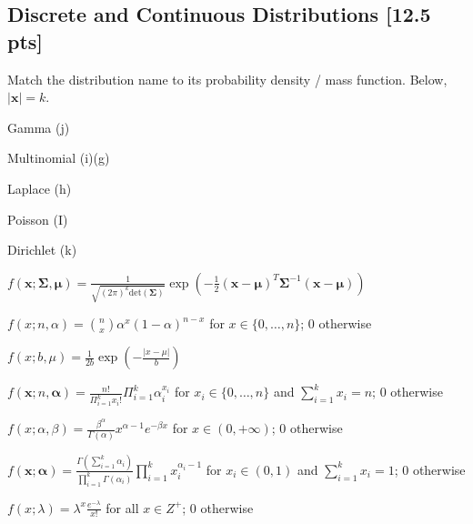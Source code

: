 \documentclass[a4paper]{article}
\theoremstyle{definition}
\newcommand{\vc}[1]{\boldsymbol{#1}}
\newcommand{\xv}{\vc{x}}
\newcommand{\Sigmav}{\vc{\Sigma}}
\newcommand{\alphav}{\vc{\alpha}}
\newcommand{\muv}{\vc{\mu}}
\newenvironment{soln}{
	\leavevmode\color{blue}\ignorespaces
}{}
\begin{document}
	\subsection{Discrete and Continuous Distributions [12.5 pts]}
	Match the distribution name to its probability density / mass
	function. Below, $|\xv| = k$.
	\begin{enumerate}[(a)]
		\begin{minipage}{0.3\linewidth}
			\item Gamma \begin{soln}  (j) \end{soln}
			\item Multinomial  \begin{soln}  (i)(g) \end{soln}
			\item Laplace \begin{soln}  (h) \end{soln}
			\item Poisson \begin{soln}  (I) \end{soln}
			\item Dirichlet  \begin{soln}  (k) \end{soln}
			
		\end{minipage}
		\begin{minipage}{0.5\linewidth}
			\item $f(\xv; \Sigmav, \muv) = \frac{1}{\sqrt{(2\pi)^k \mathrm{det}(\Sigmav) }} \exp\left( -\frac{1}{2}
			(\xv - \muv)^T \Sigmav^{-1} (\xv - \muv)  \right)$
			\item $f(x; n, \alpha) = \binom{n}{x} \alpha^x (1 - \alpha)^{n-x}$
			for $x \in \{0,\ldots, n\}$; $0$ otherwise
			\item $f(x; b, \mu) = \frac{1}{2b} \exp\left( - \frac{|x - \mu|}{b} \right)$
			\item $f(\xv; n, \alphav) = \frac{n!}{\Pi_{i=1}^k x_i!}
			\Pi_{i=1}^k \alpha_i^{x_i}$ for $x_i \in \{0,\ldots,n\}$ and
			$\sum_{i=1}^k x_i = n$; $0$ otherwise
			\item $f(x; \alpha, \beta) = \frac{\beta^{\alpha}}{\Gamma(\alpha)} x^{\alpha -
				1}e^{-\beta x}$ for $x \in (0,+\infty)$; $0$ otherwise
			\item $f(\xv; \alphav) = \frac{\Gamma(\sum_{i=1}^k
				\alpha_i)}{\prod_{i=1}^k \Gamma(\alpha_i)} \prod_{i=1}^{k}
			x_i^{\alpha_i - 1}$ for $x_i \in (0,1)$ and $\sum_{i=1}^k x_i =
			1$; 0 otherwise
			\item $f(x; \lambda) = \lambda^x \frac{e^{-\lambda}}{x!}$ for all
			$x \in Z^+$; $0$ otherwise
		\end{minipage}
	\end{enumerate}
	
\end{document}
